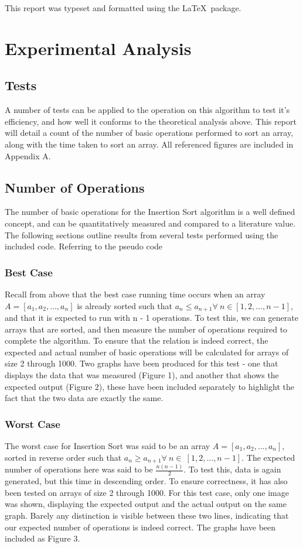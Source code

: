 \documentclass{article}
\begin{document}
    This report was typeset and formatted using the \LaTeX\  package.

\section{Experimental Analysis}
    \subsection{Tests}
        A number of tests can be applied to the operation on this algorithm to test it's efficiency, and how well it conforms to the theoretical analysis above. This report will detail a count of the number of basic operations performed to sort an array, along with the time taken to sort an array. All referenced figures are included in Appendix A.

    \subsection{Number of Operations}
        The number of basic operations for the Insertion Sort algorithm is a well defined concept, and can be quantitatively measured and compared to a literature value. The following sections outline results from several tests performed using the included code. Referring to the pseudo code 
        \subsubsection{Best Case}
            Recall from above that the best case running time occurs when an array $A = [a_1, a_2, ..., a_n]$ is already sorted such that $a_n \leq a_{n+1} \forall\ n \in [1, 2, ..., n - 1]$, and that it is expected to run with n - 1 operations. To test this, we can generate arrays that are sorted, and then measure the number of operations required to complete the algorithm. To ensure that the relation is indeed correct, the expected and actual number of basic operations will be calculated for arrays of size 2 through 1000. Two graphs have been produced for this test - one that displays the data that was measured (Figure 1), and another that shows the expected output (Figure 2), these have been included separately to highlight the fact that the two data are exactly the same.

        \subsubsection{Worst Case}
            The worst case for Insertion Sort was said to be an array $A = [a_1, a_2, ..., a_n]$, sorted in reverse order such that $a_n \geq a_{n+1} \forall\ n \in\ [1, 2, ..., n - 1]$. The expected number of operations here was said to be $\frac{n(n - 1)}{2}$. To test this, data is again generated, but this time in descending order. To ensure correctness, it has also been tested on arrays of size 2 through 1000. For this test case, only one image was shown, displaying the expected output and the actual output on the same graph. Barely any distinction is visible between these two lines, indicating that our expected number of operations is indeed correct. The graphs have been included as Figure 3.
\end{document}
